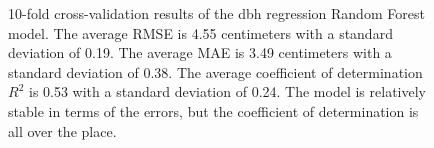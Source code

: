 \begin{figure}
\caption[Cross-validation results of the dbh regression Random Forest model.]{\label{fig-cv-reg}10-fold cross-validation results of the dbh
regression Random Forest model. The average RMSE is 4.55 centimeters
with a standard deviation of 0.19. The average MAE is 3.49 centimeters
with a standard deviation of 0.38. The average coefficient of
determination \(R^2\) is 0.53 with a standard deviation of 0.24. The
model is relatively stable in terms of the errors, but the coefficient
of determination is all over the place.}
\end{figure}

